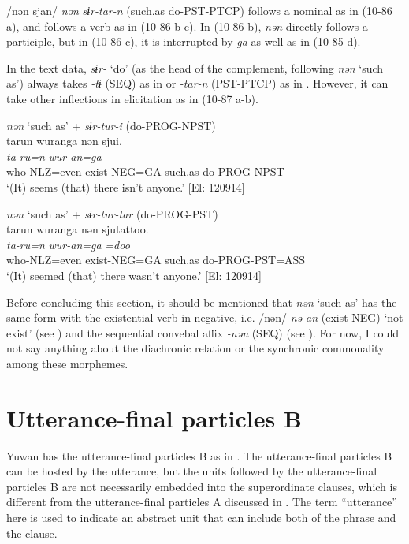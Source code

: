 /nən sjan/ \textit{nən} \textit{sɨr-tar-n} (such.as do-PST-PTCP) follows a nominal as in (10-86 a), and follows a verb as in (10-86 b-c). In (10-86 b), \textit{nən} directly follows a participle, but in (10-86 c), it is interrupted by \textit{ga} as well as in (10-85 d).

  In the text data, \textit{sɨr-} ‘do’ (as the head of the complement, following \textit{nən} ‘such as’) always takes \textit{{}-tɨ} (SEQ) as in  or \textit{{}-tar-n} (PST-PTCP) as in . However, it can take other inflections in elicitation as in (10-87 a-b).

\ea\label{ex:10.87}   
\ea \textit{nən} ‘such as’ + \textit{sɨr-tur-i} (do-PROG-NPST)\\
      \glll    tarun  wuranga  nən  sjui.\\
    \textit{ta-ru=n}  \textit{wur-an=ga}  \textit{}  \textit{}\\
    who-NLZ=even  exist-NEG=GA  such.as  do-PROG-NPST\\
    \glt     ‘(It) seems (that) there isn’t anyone.’ [El: 120914]

  \ex \textit{nən} ‘such as’ + \textit{sɨr-tur-tar} (do-PROG-PST)\\
      \glll    tarun  wuranga  nən  sjutattoo.\\
    \textit{ta-ru=n}  \textit{wur-an=ga}  \textit{}  \textit{=doo}\\
    who-NLZ=even  exist-NEG=GA  such.as  do-PROG-PST=ASS\\
    \glt     ‘(It) seemed (that) there wasn’t anyone.’ [El: 120914]
    \z
\z

  Before concluding this section, it should be mentioned that \textit{nən} ‘such as’ has the same form with the existential verb in negative, i.e. /nən/ \textit{nə-an} (exist-NEG) ‘not exist’ (see ) and the sequential convebal affix \textit{{}-nən} (SEQ) (see ). For now, I could not say anything about the diachronic relation or the synchronic commonality among these morphemes.

\section{Utterance-final particles B}\label{sec:10.5}

Yuwan has the utterance-final particles B as in . The utterance-final particles B can be hosted by the utterance, but the units followed by the utterance-final particles B are not necessarily embedded into the superordinate clauses, which is different from the utterance-final particles A discussed in . The term “utterance” here is used to indicate an abstract unit that can include both of the phrase and the clause.

